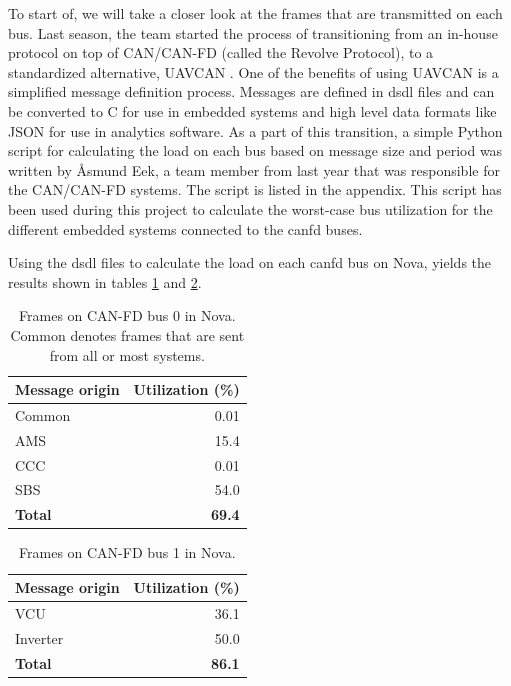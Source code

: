To start of, we will take a closer look at the frames that are transmitted on each bus. Last season, the team started the process of transitioning from an in-house protocol on top of CAN/CAN-FD (called the Revolve Protocol), to a standardized alternative, UAVCAN \cite{uavcan}. One of the benefits of using UAVCAN is a simplified message definition process. Messages are defined in \acrfull{dsdl} files and can be converted to C for use in embedded systems and high level data formats like JSON for use in analytics software. As a part of this transition, a simple Python script for calculating the load on each bus based on message size and period was written by Åsmund Eek, a team member from last year that was responsible for the CAN/CAN-FD systems. The script is listed in the appendix. This script has been used during this project to calculate the worst-case bus utilization for the different embedded systems connected to the \acrshort{canfd} buses. 

Using the \acrshort{dsdl} files to calculate the load on each \acrshort{canfd} bus on Nova, yields the results shown in tables \ref{tab:can0_nova} and \ref{tab:can1_nova}.

\begin{table}[H]
    \centering
    \caption{Frames on CAN-FD bus 0 in Nova. Common denotes frames that are sent from all or most systems.}
    \begin{tabular}{lr}
        \toprule
        Message origin & Utilization (\%) \\
        \midrule
        Common & 0.01 \\
        AMS & 15.4 \\
        CCC & 0.01 \\
        SBS & 54.0 \\
        \textbf{Total} & \textbf{69.4} \\
        \bottomrule
    \end{tabular}
    \label{tab:can0_nova}
\end{table}

\begin{table}[H]
    \centering
    \caption{Frames on CAN-FD bus 1 in Nova.}
    \begin{tabular}{lr}
        \toprule
        Message origin & Utilization (\%) \\
        \midrule
        VCU & 36.1 \\
        Inverter & 50.0 \\
        \textbf{Total} & \textbf{86.1} \\
        \bottomrule
    \end{tabular}
    \label{tab:can1_nova}
\end{table}

